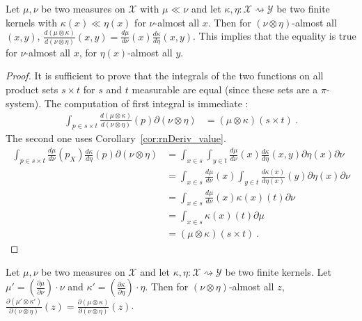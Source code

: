 \begin{lemma}
  \label{lem:rnDeriv_compProd_aux}
  \leanok
  Let $\mu, \nu$ be two measures on $\mathcal X$ with $\mu \ll \nu$ and let $\kappa, \eta : \mathcal X \rightsquigarrow \mathcal Y$ be two finite kernels with $\kappa(x) \ll \eta(x)$ for $\nu$-almost all $x$. Then for $(\nu \otimes \eta)$-almost all $(x, y)$, $\frac{d (\mu \otimes \kappa)}{d (\nu \otimes \eta)}(x,y) = \frac{d\mu}{d\nu}(x)\frac{d \kappa}{d \eta}(x,y)$.
  This implies that the equality is true for $\nu$-almost all $x$, for $\eta(x)$-almost all $y$.
\end{lemma}

\begin{proof} \leanok
{}
It is sufficient to prove that the integrals of the two functions on all product sets $s \times t$ for $s$ and $t$ measurable are equal (since these sets are a $\pi$-system). The computation of first integral is immediate :
\begin{align*}
\int_{p \in s \times t}\frac{d (\mu \otimes \kappa)}{d (\nu \otimes \eta)}(p) \partial(\nu \otimes \eta)
&= (\mu \otimes \kappa)(s \times t)
\: .
\end{align*}
The second one uses Corollary~\ref{cor:rnDeriv_value}.
\begin{align*}
\int_{p \in s \times t}\frac{d\mu}{d\nu}(p_X) \frac{d \kappa}{d \eta}(p) \partial(\nu \otimes \eta)
&= \int_{x \in s} \int_{y \in t} \frac{d\mu}{d\nu}(x) \frac{d \kappa}{d \eta}(x,y) \partial\eta(x) \partial\nu
\\
&= \int_{x \in s} \frac{d\mu}{d\nu}(x) \int_{y \in t} \frac{d \kappa(x)}{d \eta(x)}(y) \partial\eta(x) \partial\nu
\\
&= \int_{x \in s} \frac{d\mu}{d\nu}(x) \kappa(x)(t) \partial\nu
\\
&= \int_{x \in s} \kappa(x)(t) \partial\mu
\\
&= (\mu \otimes \kappa)(s \times t)
\: .
\end{align*}
\end{proof}

\begin{lemma}
  \label{lem:rnDeriv_eq_ac}
  \leanok
  Let $\mu, \nu$ be two measures on $\mathcal X$ and let $\kappa, \eta : \mathcal X \rightsquigarrow \mathcal Y$ be two finite kernels. Let $\mu' = \left(\frac{\partial \mu}{\partial \nu}\right) \cdot \nu$ and $\kappa' = \left(\frac{\partial \kappa}{\partial \eta}\right) \cdot \eta$. Then for $(\nu \otimes \eta)$-almost all $z$, $\frac{\partial(\mu' \otimes \kappa')}{\partial (\nu \otimes \eta)}(z) = \frac{\partial(\mu \otimes \kappa)}{\partial (\nu \otimes \eta)}(z)$.
\end{lemma}

